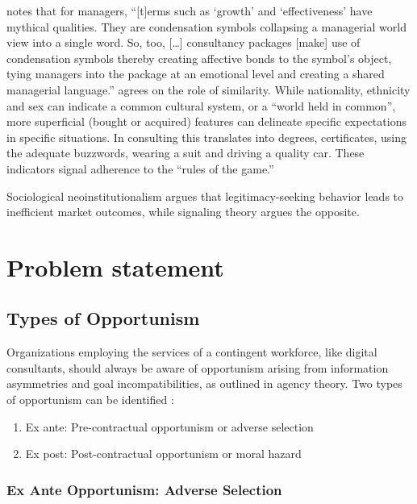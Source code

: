 \documentclass[12pt]{article}
\providecommand{\tightlist}{%
  \setlength{\itemsep}{0pt}\setlength{\parskip}{0pt}}
\begin{document}
\citet[290]{gill1993} notes that for managers, ``{[}t{]}erms such as
`growth' and `effectiveness' have mythical qualities. They are
condensation symbols collapsing a managerial world view into a single
word. So, too, {[}\ldots{]} consultancy packages {[}make{]} use of
condensation symbols thereby creating affective bonds to the symbol's
object, tying managers into the package at an emotional level and
creating a shared managerial language.'' \citet[15-16]{zucker1985}
agrees on the role of similarity. While nationality, ethnicity and sex
can indicate a common cultural system, or a ``world held in common'',
more superficial (bought or acquired) features can delineate specific
expectations in specific situations. In consulting this translates into
degrees, certificates, using the adequate buzzwords, wearing a suit and
driving a quality car. These indicators signal adherence to the ``rules
of the game.''

Sociological neoinstitutionalism argues that legitimacy-seeking behavior
leads to inefficient market outcomes, while signaling theory argues the
opposite.

\section{Problem statement}\label{problem-statement}

\subsection{Types of Opportunism}\label{types-of-opportunism}

Organizations employing the services of a contingent workforce, like
digital consultants, should always be aware of opportunism arising from
information asymmetries and goal incompatibilities, as outlined in
agency theory. Two types of opportunism can be identified
\citet[242]{clark1993}:

\begin{enumerate}
\def\labelenumi{\arabic{enumi}.}
\tightlist
\item
  Ex ante: Pre-contractual opportunism or adverse selection
\item
  Ex post: Post-contractual opportunism or moral hazard
\end{enumerate}

\subsubsection{Ex Ante Opportunism: Adverse
Selection}\label{ex-ante-opportunism-adverse-selection}
\end{document}
